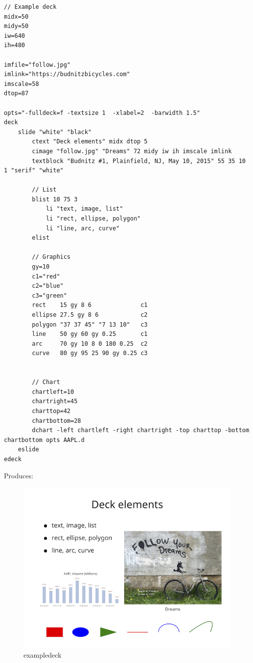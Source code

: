 \begin{verbatim}
// Example deck
midx=50
midy=50
iw=640
ih=480

imfile="follow.jpg"
imlink="https://budnitzbicycles.com"
imscale=58
dtop=87

opts="-fulldeck=f -textsize 1  -xlabel=2  -barwidth 1.5"
deck
    slide "white" "black"
        ctext "Deck elements" midx dtop 5
        cimage "follow.jpg" "Dreams" 72 midy iw ih imscale imlink
        textblock "Budnitz #1, Plainfield, NJ, May 10, 2015" 55 35 10 1 "serif" "white"

        // List
        blist 10 75 3
            li "text, image, list"
            li "rect, ellipse, polygon"
            li "line, arc, curve"
        elist

        // Graphics
        gy=10
        c1="red"
        c2="blue"
        c3="green"
        rect    15 gy 8 6              c1
        ellipse 27.5 gy 8 6            c2
        polygon "37 37 45" "7 13 10"   c3
        line    50 gy 60 gy 0.25       c1
        arc     70 gy 10 8 0 180 0.25  c2
        curve   80 gy 95 25 90 gy 0.25 c3


        // Chart
        chartleft=10
        chartright=45
        charttop=42
        chartbottom=28
        dchart -left chartleft -right chartright -top charttop -bottom chartbottom opts AAPL.d 
    eslide
edeck
\end{verbatim}

Produces:

\begin{figure}
\centering
\includegraphics{exampledeck.png}
\caption{exampledeck}
\end{figure}

